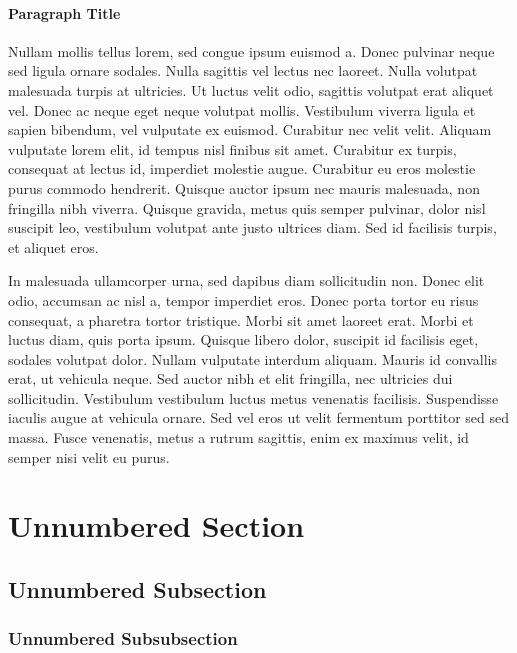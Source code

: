 \documentclass[
	11pt, %
	fleqn, %
	a4paper, %
]{LegrandOrangeBook}
\begin{document}
\paragraph{Paragraph Title} Nullam mollis tellus lorem, sed congue ipsum euismod a. Donec pulvinar neque sed ligula ornare sodales. Nulla sagittis vel lectus nec laoreet. Nulla volutpat malesuada turpis at ultricies. Ut luctus velit odio, sagittis volutpat erat aliquet vel. Donec ac neque eget neque volutpat mollis. Vestibulum viverra ligula et sapien bibendum, vel vulputate ex euismod. Curabitur nec velit velit. Aliquam vulputate lorem elit, id tempus nisl finibus sit amet. Curabitur ex turpis, consequat at lectus id, imperdiet molestie augue. Curabitur eu eros molestie purus commodo hendrerit. Quisque auctor ipsum nec mauris malesuada, non fringilla nibh viverra. Quisque gravida, metus quis semper pulvinar, dolor nisl suscipit leo, vestibulum volutpat ante justo ultrices diam. Sed id facilisis turpis, et aliquet eros.

In malesuada ullamcorper urna, sed dapibus diam sollicitudin non. Donec elit odio, accumsan ac nisl a, tempor imperdiet eros. Donec porta tortor eu risus consequat, a pharetra tortor tristique. Morbi sit amet laoreet erat. Morbi et luctus diam, quis porta ipsum. Quisque libero dolor, suscipit id facilisis eget, sodales volutpat dolor. Nullam vulputate interdum aliquam. Mauris id convallis erat, ut vehicula neque. Sed auctor nibh et elit fringilla, nec ultricies dui sollicitudin. Vestibulum vestibulum luctus metus venenatis facilisis. Suspendisse iaculis augue at vehicula ornare. Sed vel eros ut velit fermentum porttitor sed sed massa. Fusce venenatis, metus a rutrum sagittis, enim ex maximus velit, id semper nisi velit eu purus.


\section*{Unnumbered Section}

\subsection*{Unnumbered Subsection}

\subsubsection*{Unnumbered Subsubsection}
\end{document}
